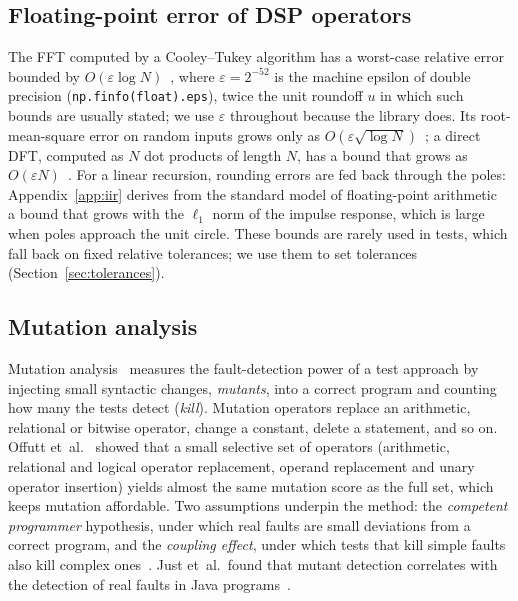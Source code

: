 \documentclass[10pt,conference]{IEEEtran}
\newcommand{\eps}{\varepsilon}
\newcommand{\code}[1]{\texttt{#1}}
\begin{document}
\subsection{Floating-point error of DSP operators}
The FFT computed by a Cooley--Tukey algorithm has a worst-case relative error
bounded by $O(\eps\log N)$~\cite{higham2002accuracy}, where
$\eps=2^{-52}$ is the machine epsilon of double precision
(\code{np.finfo(float).eps}), twice the unit roundoff $u$ in which such bounds
are usually stated; we use $\eps$ throughout because the library does. Its
root-mean-square error on random inputs grows only as
$O(\eps\sqrt{\log N})$~\cite{schatzman1996accuracy}; a direct DFT, computed as $N$
dot products of length $N$, has a bound that grows as
$O(\eps N)$~\cite{higham2002accuracy}. For a linear recursion, rounding errors
are fed back through the poles: Appendix~\ref{app:iir} derives from the
standard model of floating-point arithmetic~\cite{higham2002accuracy} a bound
that grows with the $\ell_1$ norm of the impulse response, which is large when
poles approach the unit circle. These bounds are
rarely used in tests, which fall back on fixed relative tolerances; we use them
to set tolerances (Section~\ref{sec:tolerances}).

\subsection{Mutation analysis}
Mutation analysis~\cite{jia2011mutation,papadakis2019mutation} measures the
fault-detection power of a test approach by injecting small syntactic changes,
\emph{mutants}, into a correct program and counting how many the tests detect
(\emph{kill}). Mutation operators replace an arithmetic, relational or bitwise
operator, change a constant, delete a statement, and so on. Offutt
et~al.~\cite{offutt1996mutation} showed that a small selective set of operators
(arithmetic, relational and logical operator replacement, operand replacement
and unary operator insertion) yields almost the same mutation score as the full
set, which keeps mutation affordable. Two
assumptions underpin the method: the \emph{competent programmer} hypothesis,
under which real faults are small deviations from a correct program, and the
\emph{coupling effect}, under which tests that kill simple faults also kill
complex ones~\cite{jia2011mutation}. Just et~al.\ found that mutant detection
correlates with the detection of real faults in Java
programs~\cite{just2014mutants}.
\end{document}
